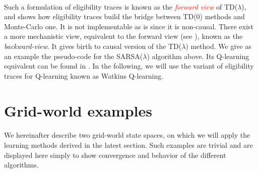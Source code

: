 \documentclass[a4paper]{report}
\begin{document}
{{{				\paragraph{} Such a formulation of eligibility traces is known as the \emph{\textcolor{red}{forward view}} of TD($\lambda$), and shows how eligibility traces build the bridge between TD(0) methods and Monte-Carlo one. It is not implementable as is since it is non-causal. There exist a more mechanistic view, equivalent to the forward view (see \cite{Sutton98a}), known as the \emph{backward-view}. It gives birth to causal version of the TD($\lambda$) method. We give as an example the pseudo-code for the SARSA($\lambda$) algorithm above. Its Q-learning equivalent can be found in \cite{Sutton98a}. In the following, we will use the variant of eligibility traces for Q-learning known as Watkins Q-learning.
			}
		}
	
		\section{Grid-world examples}
		{
			\paragraph{} We hereinafter describe two grid-world state spaces, on which we will apply the learning methods derived in the latest section. Such examples are trivial and are displayed here simply to show convergence and behavior of the different algorithms. 
			
}}
\end{document}
